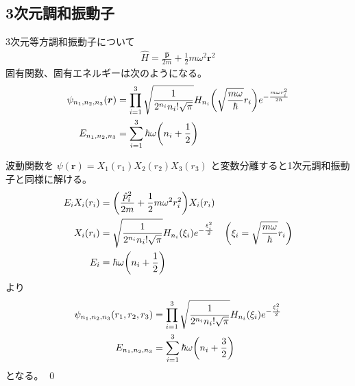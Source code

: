 \documentclass[uplatex,dvipdfmx,a4paper,11pt]{jlreq}
\makeatletter
\newcommand{\rr}{\bm{r}}
\newcommand{\pp}{\bm{p}}
\theoremstyle{definition}
\renewenvironment{proof}[1][\proofname]{\par
  \normalfont
  \topsep6\p@\@plus6\p@ \trivlist
  \item[\hskip\labelsep{\bfseries #1}\@addpunct{\bfseries}]\ignorespaces\quad\par
}{%
  \qed\endtrivlist\@endpefalse
}
\renewcommand\proofname{証明}
\makeatother
\begin{document}
\subsection{3次元調和振動子}
\begin{proposition}
  3次元等方調和振動子について
  \begin{align}
    \hat{H} = \frac{\hat{\pp}}{2m} + \frac{1}{2}m\omega^2\rr^2
  \end{align}
  固有関数、固有エネルギーは次のようになる。
  \begin{align}
    \psi_{n_1,n_2,n_3}(\rr) & = \prod_{i = 1}^3\sqrt{\frac{1}{2^{n_i}n_i!\sqrt{\pi}}}H_{n_i}\qty(\sqrt{\frac{m\omega}{\hbar}}r_i)e^{-\frac{m\omega r_i^2}{2\hbar}} \\
    E_{n_1,n_2,n_3}         & = \sum_{i=1}^{3}\hbar\omega\qty(n_i + \frac{1}{2})
  \end{align}
\end{proposition}
\begin{proof}
  波動関数を $\psi(\rr) = X_1(r_1)X_2(r_2)X_3(r_3)$ と変数分離すると1次元調和振動子と同様に解ける。
  \begin{align}
    E_iX_i(r_i) & = \qty(\frac{\hat{p}_i^2}{2m} + \frac{1}{2}m\omega^2r_i^2)X_i(r_i)                                                           \\
    X_i(r_i)    & = \sqrt{\frac{1}{2^{n_i}n_i!\sqrt{\pi}}}H_{n_i}(\xi_i)e^{-\frac{\xi_i^2}{2}} & \qty(\xi_i = \sqrt{\frac{m\omega}{\hbar}}r_i) \\
    E_i         & = \hbar\omega\qty(n_i + \frac{1}{2})
  \end{align}
  より
  \begin{align}
    \psi_{n_1,n_2,n_3}(r_1,r_2,r_3) & = \prod_{i = 1}^3\sqrt{\frac{1}{2^{n_i}n_i!\sqrt{\pi}}}H_{n_i}(\xi_i)e^{-\frac{\xi_i^2}{2}} \\
    E_{n_1,n_2,n_3}                 & = \sum_{i=1}^{3}\hbar\omega\qty(n_i + \frac{3}{2})
  \end{align}
  となる。
\end{proof}
\end{document}
